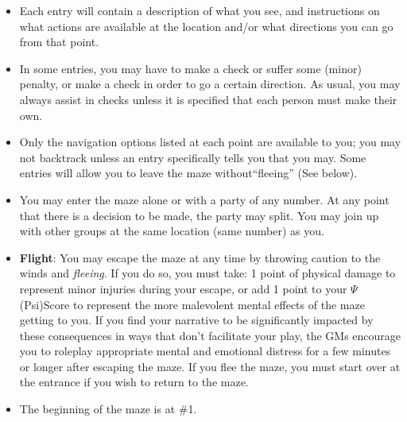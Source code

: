 \documentclass[white]{gl2018}
\begin{document}
\begin{itemize}
\item Each entry will contain a description of what you see, and instructions on what actions are available at the location and/or what directions you can go from that point.  
\item In some entries, you may have to make a check or suffer some (minor) penalty, or make a check in order to go a certain direction. As usual, you may always assist in checks unless it is specified that each person must make their own. 
\item Only the navigation options listed at each point are available to you; you may not backtrack unless an entry specifically tells you that you may. Some entries will allow you to leave the maze without``fleeing'' (See below).
\item You may enter the maze alone or with a party of any number. At any point that there is a decision to be made, the party may split. You may join up with other groups at the same location (same number) as you. 
\item {\bf Flight}: You may escape the maze at any time by throwing caution to the winds and {\em fleeing}. If you do so, you must take: 1 point of physical damage to represent minor injuries during your escape, or add 1 point to your $\Psi$ (Psi)Score to represent the more malevolent mental effects of the maze getting to you. If you find your narrative to be significantly impacted by these consequences in ways that don't facilitate your play, the GMs encourage you to roleplay appropriate mental and emotional distress for a few minutes or longer after escaping the maze. If you flee the maze, you must start over at the entrance if you wish to return to the maze. 
\item The beginning of the maze is at \#1.
\end{itemize}
\pagebreak
\end{document}
